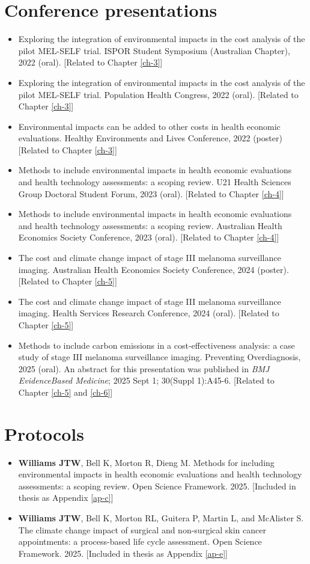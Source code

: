 \section*{Conference presentations}
\begin{itemize}
    \item Exploring the integration of environmental impacts in the cost analysis of the pilot MEL-SELF trial. ISPOR Student Symposium (Australian Chapter), 2022 (oral). [Related to Chapter \ref{ch-3}]
    \item Exploring the integration of environmental impacts in the cost analysis of the pilot MEL-SELF trial. Population Health Congress, 2022 (oral). [Related to Chapter \ref{ch-3}]
    \item Environmental impacts can be added to other costs in health economic evaluations. Healthy Environments and Lives Conference, 2022 (poster) [Related to Chapter \ref{ch-3}]
    \item Methods to include environmental impacts in health economic evaluations and health technology assessments: a scoping review. U21 Health Sciences Group Doctoral Student Forum, 2023 (oral). [Related to Chapter \ref{ch-4}]
    \item Methods to include environmental impacts in health economic evaluations and health technology assessments: a scoping review. Australian Health Economics Society Conference, 2023 (oral). [Related to Chapter \ref{ch-4}]
    \item The cost and climate change impact of stage III melanoma surveillance imaging. Australian Health Economics Society Conference, 2024 (poster). [Related to Chapter \ref{ch-5}] 
    \item The cost and climate change impact of stage III melanoma surveillance imaging. Health Services Research Conference, 2024 (oral). [Related to Chapter \ref{ch-5}]
    \item Methods to include carbon emissions in a cost-effectiveness analysis: a case study of stage III melanoma surveillance imaging. Preventing Overdiagnosis, 2025 (oral). An abstract for this presentation was published in \textit{BMJ EvidenceBased Medicine}; 2025 Sept 1; 30(Suppl 1):A45-6. [Related to Chapter \ref{ch-5} and \ref{ch-6}]
\end{itemize}

\section*{Protocols}
\begin{itemize}
    \item \textbf{Williams JTW}, Bell K, Morton R, Dieng M. Methods for including environmental impacts in health economic evaluations and health technology assessments: a scoping review. Open Science Framework. 2025. [Included in thesis as Appendix \ref{ap-c}]
    \item \textbf{Williams JTW}, Bell K, Morton RL, Guitera P, Martin L, and McAlister S. The climate change impact of surgical and non-surgical skin cancer appointments: a process-based life cycle assessment. Open Science Framework. 2025. [Included in thesis as Appendix \ref{ap-e}]

\end{itemize}

